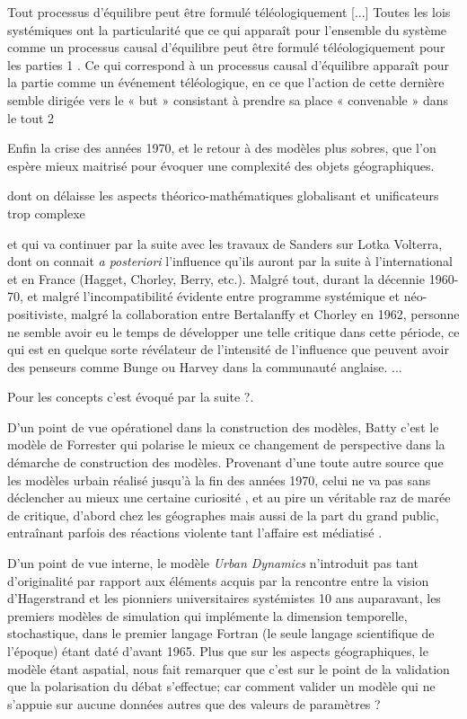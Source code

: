 \autocite[114]{Pouvreau2013}
Tout processus d’équilibre peut être formulé téléologiquement [...] Toutes les lois systémiques ont
la particularité que ce qui apparaît pour l’ensemble du système comme un processus causal
d’équilibre peut être formulé téléologiquement pour les parties 1 .
Ce qui correspond à un processus causal d’équilibre apparaît pour la partie comme un événement
téléologique, en ce que l’action de cette dernière semble dirigée vers le « but » consistant à prendre
sa place « convenable » dans le tout 2

Enfin la crise des années 1970, et le retour à des modèles plus sobres, que l'on espère mieux maitrisé pour évoquer une complexité des objets géographiques.

dont on délaisse les aspects théorico-mathématiques globalisant et unificateurs trop complexe

et qui va continuer par la suite avec les travaux de Sanders sur Lotka Volterra,   dont on connait \textit{a posteriori} l'influence qu'ils auront par la suite à l'international et en France (Hagget, Chorley, Berry, etc.). Malgré tout, durant la décennie 1960-70, et malgré l'incompatibilité  évidente entre programme systémique et néo-positiviste, malgré la collaboration entre Bertalanffy et Chorley en 1962, personne ne semble avoir eu le temps de développer une telle critique dans cette période, ce qui est en quelque sorte révélateur de l'intensité de l'influence que peuvent avoir des penseurs comme Bunge ou Harvey dans la communauté anglaise. \autocite[123]{Unwin1992}...

Pour les concepts c'est évoqué par la suite ?. 



D'un point de vue opérationel dans la construction des modèles, Batty \autocite{Batty2001} \autocite[13]{Batty2008} c'est le modèle de Forrester \autocite{Forrester1969} qui polarise le mieux ce changement de perspective dans la démarche de construction des modèles. Provenant d'une toute autre source que les modèles urbain réalisé jusqu'à la fin des années 1970, celui ne va pas sans déclencher au mieux une certaine curiosité \autocite{Lee1973} , et au pire un véritable raz de marée de critique, d'abord chez les géographes\autocite{Tobler1970a} mais aussi de la part du grand public, entraînant parfois des réactions violente tant l'affaire est médiatisé \autocite[9]{Forrester1989}. 

D'un point de vue interne, le modèle \textit{Urban Dynamics} n'introduit pas tant d'originalité par rapport aux éléments acquis par la rencontre entre la vision d'Hagerstrand et les pionniers universitaires systémistes 10 ans auparavant, les premiers modèles de simulation qui implémente la dimension temporelle, stochastique, dans le premier langage Fortran (le seule langage scientifique de l'époque) étant daté d'avant 1965. Plus que sur les aspects géographiques, le modèle étant aspatial, \autocite{Batty2001} nous fait remarquer que c'est sur le point de la validation que la polarisation du débat s'effectue; car comment valider un modèle qui ne s'appuie sur aucune données autres que des valeurs de paramètres ?

